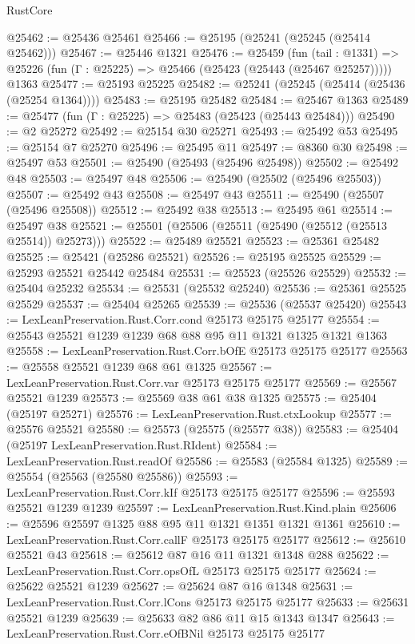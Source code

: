 \begin{lexlean}{RustCore}
\begin{coremodule}
@25462 := @25436 @25461
@25466 := @25195 (@25241 (@25245 (@25414 @25462)))
@25467 := @25446 @1321
@25476 := @25459
    (fun (tail : @1331) => @25226 (fun (Γ : @25225) => @25466 (@25423 (@25443 (@25467 @25257)))))
    @1363
@25477 := @25193 @25225
@25482 := @25241 (@25245 (@25414 (@25436 (@25254 @1364))))
@25483 := @25195 @25482
@25484 := @25467 @1363
@25489 := @25477 (fun (Γ : @25225) => @25483 (@25423 (@25443 @25484)))
@25490 := @2 @25272
@25492 := @25154 @30 @25271
@25493 := @25492 @53
@25495 := @25154 @7 @25270
@25496 := @25495 @11
@25497 := @8360 @30
@25498 := @25497 @53
@25501 := @25490 (@25493 (@25496 @25498))
@25502 := @25492 @48
@25503 := @25497 @48
@25506 := @25490 (@25502 (@25496 @25503))
@25507 := @25492 @43
@25508 := @25497 @43
@25511 := @25490 (@25507 (@25496 @25508))
@25512 := @25492 @38
@25513 := @25495 @61
@25514 := @25497 @38
@25521 := @25501 (@25506 (@25511 (@25490 (@25512 (@25513 @25514)) @25273)))
@25522 := @25489 @25521
@25523 := @25361 @25482
@25525 := @25421 (@25286 @25521)
@25526 := @25195 @25525
@25529 := @25293 @25521 @25442 @25484
@25531 := @25523 (@25526 @25529)
@25532 := @25404 @25232
@25534 := @25531 (@25532 @25240)
@25536 := @25361 @25525 @25529
@25537 := @25404 @25265
@25539 := @25536 (@25537 @25420)
@25543 := LexLeanPreservation.Rust.Corr.cond @25173 @25175 @25177
@25554 := @25543 @25521 @1239 @1239 @68 @88 @95 @11 @1321 @1325 @1321 @1363
@25558 := LexLeanPreservation.Rust.Corr.bOfE @25173 @25175 @25177
@25563 := @25558 @25521 @1239 @68 @61 @1325
@25567 := LexLeanPreservation.Rust.Corr.var @25173 @25175 @25177
@25569 := @25567 @25521 @1239
@25573 := @25569 @38 @61 @38 @1325
@25575 := @25404 (@25197 @25271)
@25576 := LexLeanPreservation.Rust.ctxLookup
@25577 := @25576 @25521
@25580 := @25573 (@25575 (@25577 @38))
@25583 := @25404 (@25197 LexLeanPreservation.Rust.RIdent)
@25584 := LexLeanPreservation.Rust.readOf
@25586 := @25583 (@25584 @1325)
@25589 := @25554 (@25563 (@25580 @25586))
@25593 := LexLeanPreservation.Rust.Corr.kIf @25173 @25175 @25177
@25596 := @25593 @25521 @1239 @1239
@25597 := LexLeanPreservation.Rust.Kind.plain
@25606 := @25596 @25597 @1325 @88 @95 @11 @1321 @1351 @1321 @1361
@25610 := LexLeanPreservation.Rust.Corr.callF @25173 @25175 @25177
@25612 := @25610 @25521 @43
@25618 := @25612 @87 @16 @11 @1321 @1348 @288
@25622 := LexLeanPreservation.Rust.Corr.opsOfL @25173 @25175 @25177
@25624 := @25622 @25521 @1239
@25627 := @25624 @87 @16 @1348
@25631 := LexLeanPreservation.Rust.Corr.lCons @25173 @25175 @25177
@25633 := @25631 @25521 @1239
@25639 := @25633 @82 @86 @11 @15 @1343 @1347
@25643 := LexLeanPreservation.Rust.Corr.eOfBNil @25173 @25175 @25177

\end{coremodule}
\end{lexlean}

